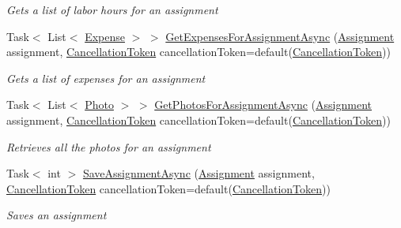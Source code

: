 \begin{DoxyCompactItemize}
\begin{DoxyCompactList}\small\item\em Gets a list of labor hours for an assignment \end{DoxyCompactList}\item 
Task$<$ List$<$ \hyperlink{class_field_service_1_1_data_1_1_expense}{Expense} $>$ $>$ \hyperlink{class_field_service_1_1_data_1_1_sample_assignment_service_ab51f31e7868ba97761cb07d71330563e}{Get\+Expenses\+For\+Assignment\+Async} (\hyperlink{class_field_service_1_1_data_1_1_assignment}{Assignment} assignment, \hyperlink{_view_models_2_assignment_view_model_8cs_aba80ec766846c61f55644fd23860cb18}{Cancellation\+Token} cancellation\+Token=default(\hyperlink{_view_models_2_assignment_view_model_8cs_aba80ec766846c61f55644fd23860cb18}{Cancellation\+Token}))
\begin{DoxyCompactList}\small\item\em Gets a list of expenses for an assignment \end{DoxyCompactList}\item 
Task$<$ List$<$ \hyperlink{class_field_service_1_1_data_1_1_photo}{Photo} $>$ $>$ \hyperlink{class_field_service_1_1_data_1_1_sample_assignment_service_a959b5cf6fd8467641c5ae73dc511839e}{Get\+Photos\+For\+Assignment\+Async} (\hyperlink{class_field_service_1_1_data_1_1_assignment}{Assignment} assignment, \hyperlink{_view_models_2_assignment_view_model_8cs_aba80ec766846c61f55644fd23860cb18}{Cancellation\+Token} cancellation\+Token=default(\hyperlink{_view_models_2_assignment_view_model_8cs_aba80ec766846c61f55644fd23860cb18}{Cancellation\+Token}))
\begin{DoxyCompactList}\small\item\em Retrieves all the photos for an assignment \end{DoxyCompactList}\item 
Task$<$ int $>$ \hyperlink{class_field_service_1_1_data_1_1_sample_assignment_service_aa59289802cf0f7378e37cf17c5ee583e}{Save\+Assignment\+Async} (\hyperlink{class_field_service_1_1_data_1_1_assignment}{Assignment} assignment, \hyperlink{_view_models_2_assignment_view_model_8cs_aba80ec766846c61f55644fd23860cb18}{Cancellation\+Token} cancellation\+Token=default(\hyperlink{_view_models_2_assignment_view_model_8cs_aba80ec766846c61f55644fd23860cb18}{Cancellation\+Token}))
\begin{DoxyCompactList}\small\item\em Saves an assignment \end{DoxyCompactList}\item 

\end{DoxyCompactItemize}
